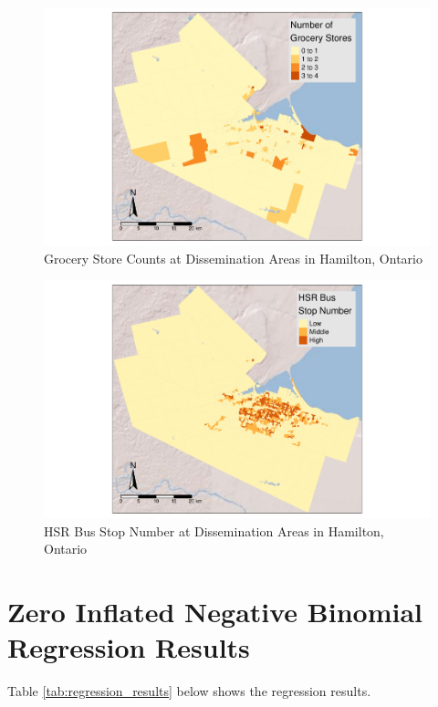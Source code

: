 \documentclass[preprint, 3p,
authoryear]{elsarticle} %
\begin{document}
\begin{figure}
\centering
\includegraphics{grocery_store_hamilton_files/figure-latex/unnamed-chunk-9-1.pdf}
\caption{\label{fig::grocery_DA}Grocery Store Counts at Dissemination
Areas in Hamilton, Ontario}
\end{figure}

\begin{figure}
\centering
\includegraphics{grocery_store_hamilton_files/figure-latex/unnamed-chunk-10-1.pdf}
\caption{\label{fig::hsr_stops}HSR Bus Stop Number at Dissemination
Areas in Hamilton, Ontario}
\end{figure}

\section{Zero Inflated Negative Binomial Regression
Results}\label{zero-inflated-negative-binomial-regression-results}

Table \ref{tab:regression_results} below shows the regression results.
\end{document}
